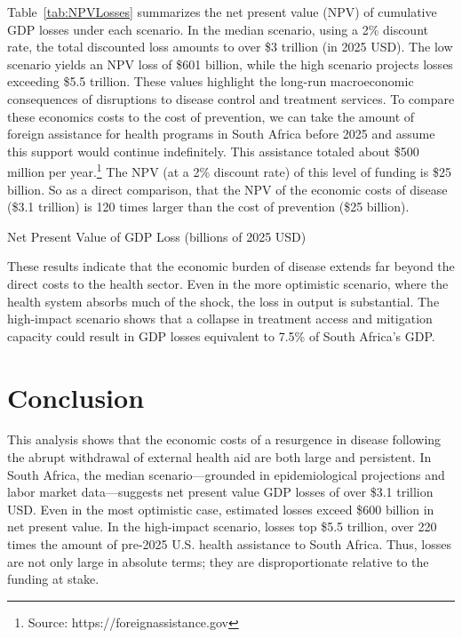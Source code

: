 \documentclass[letterpaper,12pt]{article}
\theoremstyle{definition}
\begin{document}
\begin{spacing}{1.5}
Table~\ref{tab:NPVLosses} summarizes the net present value (NPV) of cumulative GDP losses under each scenario. In the median scenario, using a 2\% discount rate, the total discounted loss amounts to over \$3 trillion (in 2025 USD). The low scenario yields an NPV loss of \$601 billion, while the high scenario projects losses exceeding \$5.5 trillion. These values highlight the long-run macroeconomic consequences of disruptions to disease control and treatment services.  To compare these economics costs to the cost of prevention, we can take the amount of foreign assistance for health programs in South Africa before 2025 and assume this support would continue indefinitely. This assistance totaled about \$500 million per year.\footnote{Source: https://foreignassistance.gov} The NPV (at a 2\% discount rate) of this level of funding is \$25 billion.  So as a direct comparison, that the NPV of the economic costs of disease (\$3.1 trillion) is 120 times larger than the cost of prevention (\$25 billion).

\begin{table}[H]
\centering
\caption{Net Present Value of GDP Loss (billions of 2025 USD)}

\label{tab:NPVLosses}
\end{table}

These results indicate that the economic burden of disease extends far beyond the direct costs to the health sector. Even in the more optimistic scenario, where the health system absorbs much of the shock, the loss in output is substantial. The high-impact scenario shows that a collapse in treatment access and mitigation capacity could result in GDP losses equivalent to 7.5\% of South Africa's GDP.



\section{Conclusion}\label{SecConc}


This analysis shows that the economic costs of a resurgence in disease following the abrupt withdrawal of external health aid are both large and persistent. In South Africa, the median scenario—grounded in epidemiological projections and labor market data—suggests net present value GDP losses of over \$3.1 trillion USD. Even in the most optimistic case, estimated losses exceed \$600 billion in net present value. In the high-impact scenario, losses top \$5.5 trillion, over 220 times the amount of pre-2025 U.S. health assistance to South Africa. Thus, losses are not only large in absolute terms; they are disproportionate relative to the funding at stake.


\end{spacing}
\end{document}
